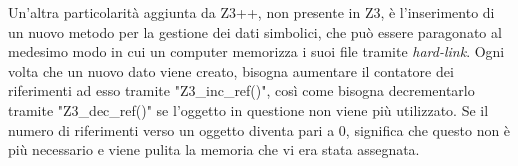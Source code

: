 \documentclass[Lau, oneside]{sapthesis}%
\begin{document}
\newline \newline
Un'altra particolarità aggiunta da Z3++, non presente in Z3, è l'inserimento di un nuovo metodo per la gestione dei dati simbolici, che può essere paragonato al medesimo modo in cui un computer memorizza i suoi file tramite \textit{hard-link}.
\newline
Ogni volta che un nuovo dato viene creato, bisogna aumentare il contatore dei riferimenti ad esso tramite "Z3\_inc\_ref()", così come bisogna decrementarlo tramite "Z3\_dec\_ref()" se l'oggetto in questione non viene più utilizzato.
\newline
Se il numero di riferimenti verso un oggetto diventa pari a 0, significa che questo non è più necessario e viene pulita la memoria che vi era stata assegnata.

\newpage
\end{document}
